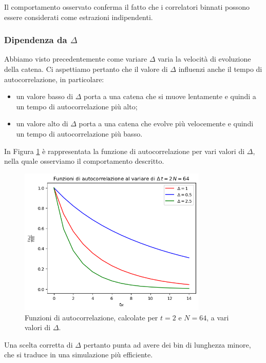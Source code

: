 \documentclass{article}
\begin{document}
Il comportamento osservato conferma il fatto che i correlatori binnati possono essere considerati come estrazioni indipendenti.

\subsubsection{Dipendenza da $\Delta$}
Abbiamo visto precedentemente come variare $\Delta$ varia la velocità di evoluzione della catena. Ci aspettiamo pertanto che il valore di $\Delta$ influenzi anche il tempo di autocorrelazione, in particolare:
\begin{itemize}
    \item un valore basso di $\Delta$ porta a una catena che si muove lentamente e quindi a un tempo di autocorrelazione più alto;
    \item un valore alto di $\Delta$ porta a una catena che evolve più velocemente e quindi un tempo di autocorrelazione più basso.
\end{itemize}
In Figura \ref{grafico gamma varie delta} è rappresentata la funzione di autocorrelazione per vari valori di $\Delta$, nella quale osserviamo il comportamento descritto. 
\begin{figure}[h]
    \centering
    \includegraphics[width=0.8\textwidth]{images/gamma_differentDelta.png}
    \caption{Funzioni di autocorrelazione, calcolate per $t=2$ e $N=64$, a vari valori di $\Delta$.}
    \label{grafico gamma varie delta}
\end{figure}

Una scelta corretta di $\Delta$ pertanto punta ad avere dei bin di lunghezza minore, che si traduce in una simulazione più efficiente. 
\end{document}
